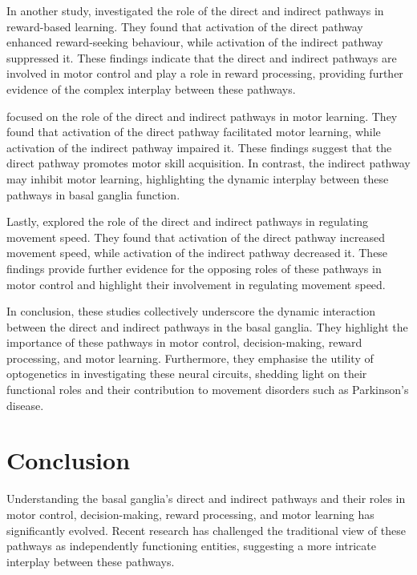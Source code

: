 \documentclass[10pt]{article}
\begin{document}
\begin{sloppypar}
  In another study, \cite{guillaumin_optogenetic_2020} investigated the role of the direct and indirect pathways in reward-based learning. They found that activation of the direct pathway enhanced reward-seeking behaviour, while activation of the indirect pathway suppressed it. These findings indicate that the direct and indirect pathways are involved in motor control and play a role in reward processing, providing further evidence of the complex interplay between these pathways.

  \cite{hilt_evidence_2016} focused on the role of the direct and indirect pathways in motor learning. They found that activation of the direct pathway facilitated motor learning, while activation of the indirect pathway impaired it. These findings suggest that the direct pathway promotes motor skill acquisition. In contrast, the indirect pathway may inhibit motor learning, highlighting the dynamic interplay between these pathways in basal ganglia function.

  Lastly, \cite{wang_direct_2015} explored the role of the direct and indirect pathways in regulating movement speed. They found that activation of the direct pathway increased movement speed, while activation of the indirect pathway decreased it. These findings provide further evidence for the opposing roles of these pathways in motor control and highlight their involvement in regulating movement speed.

  In conclusion, these studies collectively underscore the dynamic interaction between the direct and indirect pathways in the basal ganglia. They highlight the importance of these pathways in motor control, decision-making, reward processing, and motor learning. Furthermore, they emphasise the utility of optogenetics in investigating these neural circuits, shedding light on their functional roles and their contribution to movement disorders such as Parkinson’s disease.

  \section{Conclusion}
  \label{sec:conclusion}

  Understanding the basal ganglia’s direct and indirect pathways and their roles in motor control, decision-making, reward processing, and motor learning has significantly evolved. Recent research has challenged the traditional view of these pathways as independently functioning entities, suggesting a more intricate interplay between these pathways.


\end{sloppypar}
\end{document}
